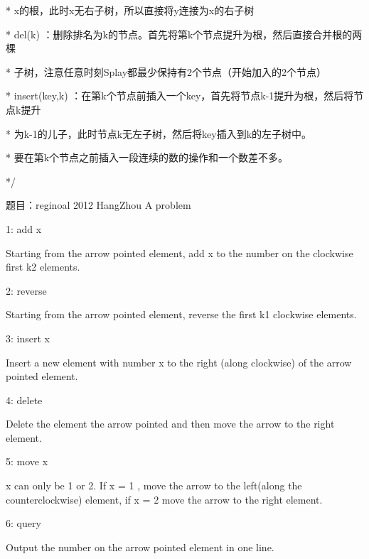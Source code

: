  *                        x的根，此时x无右子树，所以直接将y连接为x的右子树 \par
 * del(k)               ：删除排名为k的节点。首先将第k个节点提升为根，然后直接合并根的两棵 \par
 *                         子树，注意任意时刻Splay都最少保持有2个节点（开始加入的2个节点） \par
 * insert(key,k)      ：在第k个节点前插入一个key，首先将节点k-1提升为根，然后将节点k提升 \par
 *                      为k-1的儿子，此时节点k无左子树，然后将key插入到k的左子树中。 \par
 *                         要在第k个节点之前插入一段连续的数的操作和一个数差不多。 \par
*/ \par

题目：reginoal 2012 HangZhou A problem \par
1: add x \par
Starting from the arrow pointed element, add x to the number on the clockwise first k2 elements.\par
 \par
2: reverse \par
Starting from the arrow pointed element, reverse the first k1 clockwise elements. \par
 \par
3: insert x  \par
Insert a new element with number x to the right (along clockwise) of the arrow pointed element. \par
 \par
4: delete  \par
Delete the element the arrow pointed and then move the arrow to the right element. \par
 \par
5: move x  \par
x can only be 1 or 2. If x = 1 , move the arrow to the left(along the counterclockwise) element, if x = 2 move the arrow to the right element. \par
 \par
6: query \par
Output the number on the arrow pointed element in one line. \par

